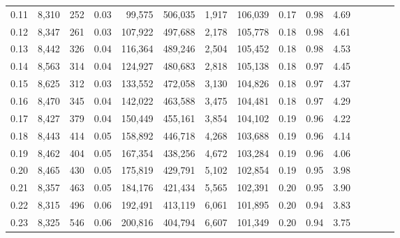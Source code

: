\begin{tabular}{rrrcrrrrrrrrrrr}
0.11 &   8,310 &    252 &                                       0.03 &   99,575 &  506,035 &    1,917 &  106,039 &  0.17 &  0.98 &                         4.69 \\
0.12 &   8,347 &    261 &                                       0.03 &  107,922 &  497,688 &    2,178 &  105,778 &  0.18 &  0.98 &                         4.61 \\
0.13 &   8,442 &    326 &                                       0.04 &  116,364 &  489,246 &    2,504 &  105,452 &  0.18 &  0.98 &                         4.53 \\
0.14 &   8,563 &    314 &                                       0.04 &  124,927 &  480,683 &    2,818 &  105,138 &  0.18 &  0.97 &                         4.45 \\
0.15 &   8,625 &    312 &                                       0.03 &  133,552 &  472,058 &    3,130 &  104,826 &  0.18 &  0.97 &                         4.37 \\
0.16 &   8,470 &    345 &                                       0.04 &  142,022 &  463,588 &    3,475 &  104,481 &  0.18 &  0.97 &                         4.29 \\
0.17 &   8,427 &    379 &                                       0.04 &  150,449 &  455,161 &    3,854 &  104,102 &  0.19 &  0.96 &                         4.22 \\
0.18 &   8,443 &    414 &                                       0.05 &  158,892 &  446,718 &    4,268 &  103,688 &  0.19 &  0.96 &                         4.14 \\
0.19 &   8,462 &    404 &                                       0.05 &  167,354 &  438,256 &    4,672 &  103,284 &  0.19 &  0.96 &                         4.06 \\
0.20 &   8,465 &    430 &                                       0.05 &  175,819 &  429,791 &    5,102 &  102,854 &  0.19 &  0.95 &                         3.98 \\
0.21 &   8,357 &    463 &                                       0.05 &  184,176 &  421,434 &    5,565 &  102,391 &  0.20 &  0.95 &                         3.90 \\
0.22 &   8,315 &    496 &                                       0.06 &  192,491 &  413,119 &    6,061 &  101,895 &  0.20 &  0.94 &                         3.83 \\
0.23 &   8,325 &    546 &                                       0.06 &  200,816 &  404,794 &    6,607 &  101,349 &  0.20 &  0.94 &                         3.75 \\

\end{tabular}
